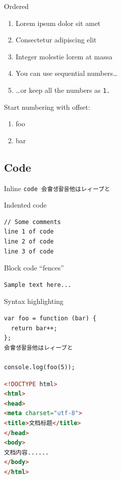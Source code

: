 \documentclass[
  paper=a4,
  ,captions=tableheading
]{scrartcl}
\providecommand{\tightlist}{%
  \setlength{\itemsep}{0pt}\setlength{\parskip}{0pt}}
\begin{document}
Ordered

\begin{enumerate}
\def\labelenumi{\arabic{enumi}.}
\item
  Lorem ipsum dolor sit amet
\item
  Consectetur adipiscing elit
\item
  Integer molestie lorem at massa
\item
  You can use sequential numbers\ldots{}
\item
  \ldots or keep all the numbers as
  \colorbox{inlinecode-bgcolor}{\lstinline{1.}}
\end{enumerate}

Start numbering with offset:

\begin{enumerate}
\def\labelenumi{\arabic{enumi}.}
\setcounter{enumi}{56}
\tightlist
\item
  foo
\item
  bar
\end{enumerate}

\hypertarget{code}{%
\subsection{Code}\label{code}}

Inline
\colorbox{inlinecode-bgcolor}{\lstinline{code 会會생활을他はレィーブと}}

Indented code

\begin{lstlisting}
// Some comments
line 1 of code
line 2 of code
line 3 of code
\end{lstlisting}

Block code ``fences''

\begin{lstlisting}
Sample text here...
\end{lstlisting}

Syntax highlighting

\begin{lstlisting}
var foo = function (bar) {
  return bar++;
};
会會생활을他はレィーブと

console.log(foo(5));
\end{lstlisting}

\begin{lstlisting}[language=HTML]
<!DOCTYPE html>
<html>
<head>
<meta charset="utf-8">
<title>文档标题</title>
</head>
<body>
文档内容......
</body>
</html>
\end{lstlisting}
\end{document}

